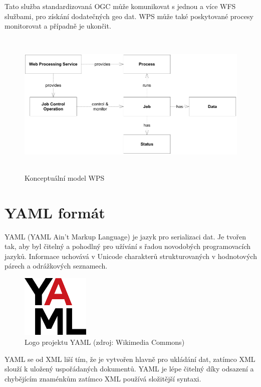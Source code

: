 \documentclass[a4paper,oneside,12pt]{book}
\begin{document}
\hspace{10mm}Tato služba standardizovaná OGC může komunikovat s jednou a více WFS službami, pro získání dodatečných geo dat. \cite{Stollberg2007} WPS může také poskytované procesy monitorovat a případně je ukončit. \cite{5Xjhvf3W3tsG6nhX} 

\begin{figure}[ht] \label{obr6}
\centering
\includegraphics[height=7cm]{pictures/WPS.png}
\caption{Konceptuální model WPS \cite{5Xjhvf3W3tsG6nhX}}
\label{fig:wps}
\end{figure}


\section{YAML formát} \label{yaml}



\hspace{10mm}YAML (YAML Ain’t Markup Language) je jazyk pro serializaci dat. Je tvořen tak, aby byl čitelný a pohodlný pro užívání s řadou novodobých programovacích jazyků. Informace uchovává v Unicode charakterů strukturovaných v hodnotových párech a  odrážkových seznamech.  \cite{hsOq0virmVAO85Ud}
\begin{figure}[ht] \label{obr7}
\centering
\includegraphics[height=3cm]{pictures/yaml.png}
\caption{Logo projektu YAML  (zdroj: Wikimedia Commons)}
\label{fig:yaml}
\end{figure}

\hspace{10mm}YAML se od XML liší tím, že je vytvořen hlavně pro ukládání dat, zatímco XML slouží k uložený uspořádaných dokumentů. YAML je lépe čitelný díky odsazení a chybějícím znaménkům zatímco XML používá složitější syntaxi. \cite{hsOq0virmVAO85Ud}
\end{document}
